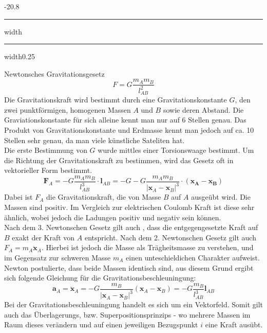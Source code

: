 \documentclass[8pt, landscape, fleqn]{scrartcl}
\makeatletter
\renewcommand{\subsection}{\@startsection{subsection}{1}{0mm}%
{-2\baselineskip}{0.8\baselineskip}%
{\hrule depth 0.2pt width\columnwidth\hrule depth0.75pt
width0.25\columnwidth\vspace*{1.2em}\large\bfseries\rmfamily}}
\makeatother
\begin{document}
\begin{multicols*}{3}
\subsection{Newtonsches Gravitationsgesetz}
\begin{equation*}
    F = G \frac{m_A m_B}{l^2_{AB}}
\end{equation*}
Die Gravitationskraft wird bestimmt durch eine Gravitationskonstante $G$, den zwei punktförmigen, homogenen Massen $A$ und $B$ sowie deren Abstand. Die Graviationskonstante für sich alleine kennt man nur auf 6 Stellen genau. Das Produkt von Gravitationskonstante und Erdmasse kennt man jedoch auf ca. 10 Stellen sehr genau, da man viele künstliche Sateliten hat. \\

Die erste Bestimmung von $G$ wurde mittles einer Torsionswaage bestimmt. Um die Richtung der Gravitationskraft zu bestimmen, wird das Gesetz oft in vektorieller Form bestimmt.
\begin{equation*}
    \mathbf{F}_A = -G \frac{m_A m_B}{l^3_{AB}}\cdot \mathbf{l}_{AB} = -G -G \frac{m_A m_B}{|\mathbf{x}_A - \mathbf{x}_B|^3}\cdot (\mathbf{x_A} - \mathbf{x_B})
\end{equation*}
Dabei ist $F_A$ die Gravitationskraft, die von Masse $B$ auf $A$ ausgeübt wird. Die Massen sind positiv. Im Vergleich zur elektrischen Coulomb Kraft ist diese sehr ähnlich, wobei jedoch die Ladungen positiv und negativ sein können. \\

Nach dem 3. Newtonschen Gesetz gilt auch , dass die entgegengesetzte Kraft auf $B$ exakt der Kraft von $A$ entspricht. Nach dem 2. Newtonschen Gesetz gilt auch $F_A = m_A \mathbf{\ddot{x}}_A$. Hierbei ist jedoch die Masse als Trägheitsmasse zu verstehen, und im Gegensatz zur schweren Masse $m_A$ einen unteschieldichen Charakter aufweist. Newton postulierte, dass beide Massen identisch sind, aus diesem Grund ergibt sich folgende Gleichung für die Gravitationsbeschleuningung:
\begin{equation*}
    \mathbf{a}_A = \ddot{\mathbf{x}}_A = -G \frac{m_B}{|\mathbf{x}_A - \mathbf{x}_B|^3}(\mathbf{x}_A - \mathbf{x}_B) = - G \frac{m_B}{l^3_{AB}}\mathbf{l}_{AB}
\end{equation*}
Bei der Gravitationsbeschleuningung handelt es sich um ein Vektorfeld. Somit gilt auch das Überlagerungs, bzw. Superpositionsprinzips - wo mehrere Massen im Raum dieses verändern und auf einen jeweiligen Bezugspunkt $i$ eine Kraft ausübt. \\


\end{multicols*}
\end{document}
